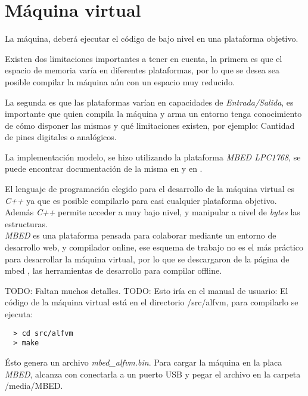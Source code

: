 \section{Máquina virtual}

  La máquina, deberá ejecutar el código de bajo nivel en una plataforma
  objetivo.

  Existen dos limitaciones importantes a tener en cuenta, la primera es que
el espacio de memoria varía en diferentes plataformas, por lo que se desea
sea posible compilar la máquina aún con un espacio muy reducido.

  La segunda es que las plataformas varían en capacidades
de \textit{Entrada/Salida}, es importante que quien compila la máquina y
arma un entorno tenga conocimiento de cómo disponer las mismas y qué
limitaciones existen, por ejemplo: Cantidad de pines digitales o analógicos.

  La implementación modelo, se hizo utilizando
  la plataforma \textit{MBED LPC1768},
se puede encontrar documentación de la misma en \cite{mbed-LPC1768} 
y en \cite{mbed}.

  El lenguaje de programación elegido para el desarrollo de la máquina virtual
es \textit{C++} ya que es posible compilarlo para casi cualquier plataforma
objetivo.
  Además \textit{C++} permite acceder a muy bajo nivel, y manipular a
nivel de \emph{bytes} las estructuras.\\

  \textit{MBED} es una plataforma pensada para colaborar mediante
un entorno de desarrollo web, y compilador online, ese esquema de 
trabajo no es el más práctico para desarrollar la máquina virtual, por
lo que se descargaron de la página de mbed \cite{mbeddev}, las herramientas
de desarrollo para compilar offline.

TODO: Faltan muchos detalles.
TODO: Esto iría en el manual de usuario:
  El código de la máquina virtual está en el directorio
  /src/alfvm, para compilarlo se ejecuta:

\begin{verbatim}
  > cd src/alfvm
  > make
\end{verbatim}

  Ésto genera un archivo \emph{mbed\_alfvm.bin}.
  Para cargar la máquina en la placa \textit{MBED}, alcanza con conectarla
a un puerto USB y pegar el archivo en la carpeta /media/MBED.


